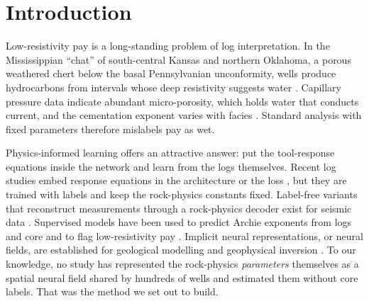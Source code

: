 \documentclass[preprint,12pt]{elsarticle}
\begin{document}
\linenumbers

\section{Introduction}

Low-resistivity pay is a long-standing problem of log interpretation. In the Mississippian
``chat'' of south-central Kansas and northern Oklahoma, a porous weathered chert below the
basal Pennsylvanian unconformity, wells produce hydrocarbons from intervals whose deep
resistivity suggests water \citep{montgomery1998chat,watney2001chat,rogers2001chat}. Capillary
pressure data indicate abundant micro-porosity, which holds water that conducts current, and
the cementation exponent varies with facies \citep{watney2001chat,kgs2002chat}. Standard
\citet{archie1942} analysis with fixed parameters therefore mislabels pay as wet.

Physics-informed learning \citep{raissi2019pinn} offers an attractive answer: put the
tool-response equations inside the network and learn from the logs themselves. Recent log
studies embed response equations in the architecture or the loss
\citep{pothana2025pinn,shao2024piml,tian2026satunn}, but they are trained with labels and
keep the rock-physics constants fixed. Label-free variants that reconstruct measurements
through a rock-physics decoder exist for seismic data \citep{vashisth2022rwpinn,li2024ppinn}.
Supervised models have been used to predict Archie exponents from logs and core
\citep{bagheri2026m,kumar2025n} and to flag low-resistivity pay \citep{gao2022lrlc}. Implicit
neural representations, or neural fields, are established for geological modelling and
geophysical inversion \citep{hillier2023geoinr,sun2023ifwi}. To our knowledge, no study has
represented the rock-physics \emph{parameters} themselves as a spatial neural field shared by
hundreds of wells and estimated them without core labels. That was the method we set out to
build.
\end{document}
